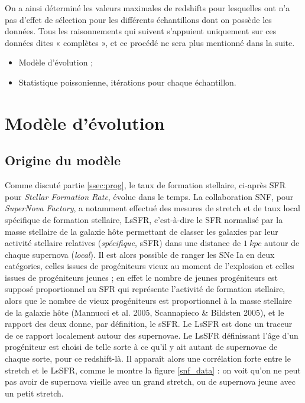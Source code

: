 \documentclass[a4paper, 12pt, svgnames]{article}
\begin{document}
On a ainsi déterminé les valeurs maximales de redshifts pour lesquelles ont n'a
pas d'effet de sélection pour les différents échantillons dont on possède les
données. Tous les raisonnements qui suivent s'appuient uniquement sur ces
données dites « complètes », et ce procédé ne sera plus mentionné dans la suite.

\begin{itemize}
    \item Modèle d'évolution ;
    \item Statistique poissonienne, itérations pour chaque échantillon.
\end{itemize}

\section{Modèle d'évolution}\label{sec:stretchevol}
\subsection{Origine du modèle}\label{ssec:stretchevol_ori}

Comme discuté partie \ref{ssec:prog}, le taux de formation stellaire, ci-après
SFR pour \textit{Stellar Formation Rate}, évolue dans le temps. La collaboration
SNF, pour \textit{SuperNova Factory}, a notamment effectué des mesures de
stretch et de taux local spécifique de formation stellaire, LsSFR, c'est-à-dire
le SFR normalisé par la masse stellaire de la galaxie hôte permettant de classer
les galaxies par leur activité stellaire relatives (\textit{spécifique}, sSFR)
dans une distance de $\SI{1}{kpc}$ autour de chaque supernova (\textit{local}).
Il est alors possible de ranger les SNe Ia en deux catégories, celles issues de
progéniteurs vieux au moment de l'explosion et celles issues de progéniteurs
jeunes ; en effet le nombre de jeunes progéniteurs est supposé proportionnel au
SFR qui représente l'activité de formation stellaire, alors que le nombre de
vieux progéniteurs est proportionnel à la masse stellaire de la galaxie hôte
(Mannucci et al. 2005, Scannapieco \& Bildsten 2005), et le rapport des deux
donne, par définition, le sSFR. Le LsSFR est donc un traceur de ce rapport
localement autour des supernovae. Le LsSFR définissant l'âge d'un progéniteur
est choisi de telle sorte à ce qu'il y ait autant de supernovae de chaque sorte,
pour ce redshift-là. Il apparaît alors une corrélation forte entre
le stretch et le LsSFR, comme le montre la figure \ref{snf_data} : on voit qu'on
ne peut pas avoir de supernova vieille avec un grand stretch, ou de supernova
jeune avec un petit stretch.
\end{document}
